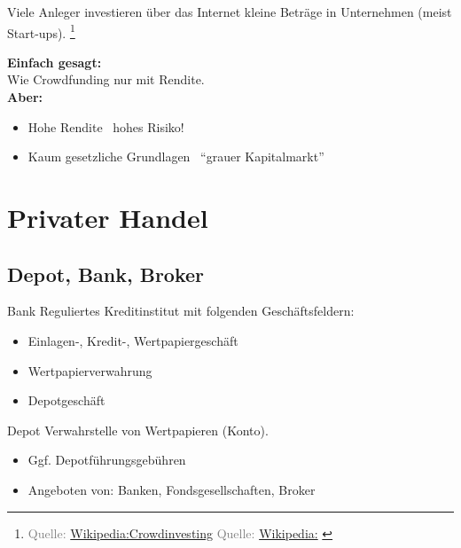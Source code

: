 \documentclass{beamer}
\newcommand{\n}{\hfill\\\vspace{0.25cm}}
\let\oldfootnote\footnote
\renewcommand{\footnote}[1]
{%
	\oldfootnote
	{
		\tiny
		\textcolor{gray}{#1}
	}%
}
\newcommand{\citewiki}[2][]
{%
	\footnote
	{
		\ifthenelse{\isempty{#1}}
		{
			Quelle: \href{https://de.wikipedia.org/wiki/#2}{Wikipedia:#2}
		}
		{
			Quelle: \href{https://de.wikipedia.org/wiki/#2}{Wikipedia:#1}
		}
	}
}
\begin{document}
			\begin{frame}
				\begin{definition}
					Viele Anleger investieren über das Internet kleine Beträge in Unternehmen (meist  Start-ups).\citewiki{Crowdinvesting}
				\end{definition}
				\textbf{Einfach gesagt:}\\
				Wie Crowdfunding nur mit Rendite.\n
				\textbf{Aber:}
				\begin{itemize}
					\item Hohe Rendite \textrightarrow\ hohes Risiko!
					\item Kaum gesetzliche Grundlagen \textrightarrow\ "`grauer Kapitalmarkt"'
				\end{itemize}
			\end{frame}
	
	\section{Privater Handel}
	
		\begin{frame}
		\end{frame}
	
		\subsection{Depot, Bank, Broker}
		
			\begin{frame}{Bank}
				Reguliertes Kreditinstitut mit folgenden Geschäftsfeldern:
				\begin{itemize}
					\item Einlagen-, Kredit-, Wertpapiergeschäft
					\item Wertpapierverwahrung
					\item Depotgeschäft
				\end{itemize}
			\end{frame}
		
			\begin{frame}{Depot}
				Verwahrstelle von Wertpapieren (Konto).
				\begin{itemize}
					\item Ggf. Depotführungsgebühren
					\item Angeboten von: Banken, Fondsgesellschaften, Broker
				\end{itemize}
			\end{frame}
		
\end{document}
